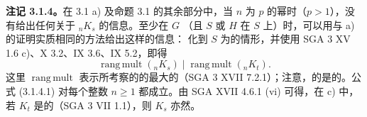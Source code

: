 \textbf{注记 3.1.4。}在 3.1 a) 及命题 3.1 的其余部分中，当 $n$ 为 $p$ 的幂时（$p>1$），没有给出任何关于 ${}_nK_s$ 的信息。至少在 $G$ （且 $S$ 或 $H$ 在 $S$ 上）时，可以用与 a) 的证明实质相同的方法给出这样的信息：
化到 $S$ 为的情形，并使用 SGA 3 XV 1.6 c)、X 3.2、IX 3.6、IX 5.2，即得
\[
 \operatorname{rang\,mult}({}_nK_s)\mid
 \operatorname{rang\,mult}({}_nK_t). \tag{3.1.4.1}
\]
这里 $\operatorname{rang\,mult}$ 表示所考察的的最大的（SGA 3 XVII 7.2.1）；注意，的是的。公式 (3.1.4.1) 对每个整数 $n\geq1$ 都成立。由 SGA XVII 4.6.1 (vi) 可得，在 c) 中，若 $K_t$ 是的（SGA 3 VII 1.1），则 $K_s$ 亦然。

